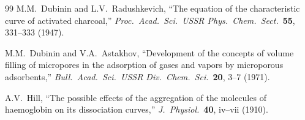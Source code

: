 \documentclass[12pt]{article}
\begin{document}
\begin{thebibliography}{99}
M.M.~Dubinin and L.V.~Radushkevich,
``The equation of the characteristic curve of activated charcoal,''
\textit{Proc.\ Acad.\ Sci.\ USSR Phys.\ Chem.\ Sect.}\
\textbf{55}, 331--333 (1947).

M.M.~Dubinin and V.A.~Astakhov,
``Development of the concepts of volume filling of micropores in the
adsorption of gases and vapors by microporous adsorbents,''
\textit{Bull.\ Acad.\ Sci.\ USSR Div.\ Chem.\ Sci.}\
\textbf{20}, 3--7 (1971).

A.V.~Hill,
``The possible effects of the aggregation of the molecules of
haemoglobin on its dissociation curves,''
\textit{J.\ Physiol.}\ \textbf{40}, iv--vii (1910).

\end{thebibliography}
\end{document}
